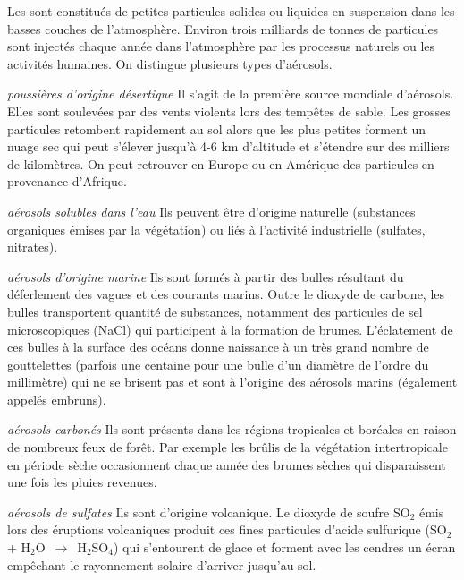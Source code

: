 
\sk
Les  sont constitués de petites particules solides ou liquides en suspension dans les basses couches de l’atmosphère. Environ trois milliards de tonnes de particules sont injectés chaque année dans l’atmosphère par les processus naturels ou les activités humaines. On distingue plusieurs types d'aérosols.
\begin{citemize}
\item[\emph{poussières d'origine désertique}] Il s'agit de la première source mondiale d’aérosols. Elles sont soulevées par des vents violents lors des tempêtes de sable. Les grosses particules retombent rapidement au sol alors que les plus petites forment un nuage sec qui peut s’élever jusqu’à 4-6 km d’altitude et s’étendre sur des milliers de kilomètres. On peut retrouver en Europe ou en Amérique des particules en provenance d'Afrique.
\item[\emph{aérosols solubles dans l’eau}] Ils peuvent être d'origine naturelle (substances organiques émises par la végétation) ou liés à l'activité industrielle (sulfates, nitrates).
\item[\emph{aérosols d'origine marine}] Ils sont formés à partir des bulles résultant du déferlement des vagues et des courants marins. Outre le dioxyde de carbone, les bulles transportent quantité de substances, notamment des particules de sel microscopiques (NaCl) qui participent à la formation de brumes. L'éclatement de ces bulles à la surface des océans donne naissance à un très grand nombre de gouttelettes (parfois une centaine pour une bulle d'un diamètre de l'ordre du millimètre) qui ne se brisent pas et sont à l'origine des aérosols marins (également appelés embruns).
\item[\emph{aérosols carbonés}] Ils sont présents dans les régions tropicales et boréales en raison de nombreux feux de forêt. Par exemple les brûlis de la végétation intertropicale en période sèche occasionnent chaque année des brumes sèches qui disparaissent une fois les pluies revenues.
\item[\emph{aérosols de sulfates}] Ils sont d'origine volcanique. Le dioxyde de soufre SO$_2$ émis lors des éruptions volcaniques produit ces fines particules d'acide sulfurique (SO$_2$ + H$_2$O~$\rightarrow$~H$_2$SO$_4$) qui s'entourent de glace et forment avec les cendres un écran empêchant le rayonnement solaire d'arriver jusqu'au sol.
\end{citemize}
